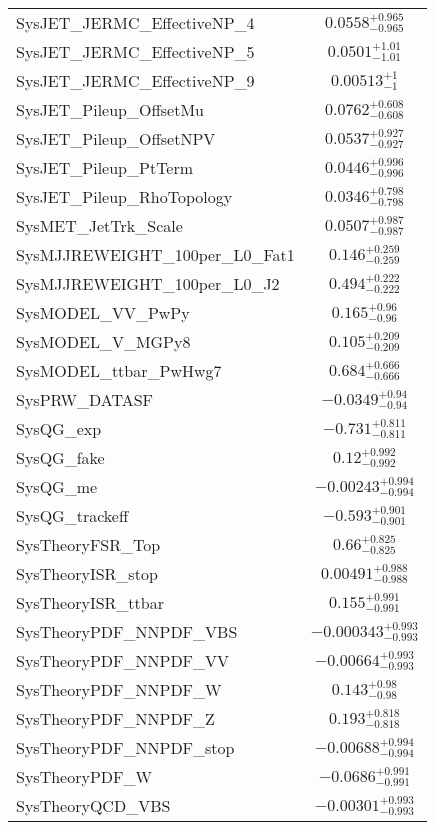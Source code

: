 \begin{tabular}{|l|c|}
SysJET\_JERMC\_EffectiveNP\_4 & $0.0558^{+0.965}_{-0.965}$ \\
SysJET\_JERMC\_EffectiveNP\_5 & $0.0501^{+1.01}_{-1.01}$ \\
SysJET\_JERMC\_EffectiveNP\_9 & $0.00513^{+1}_{-1}$ \\
SysJET\_Pileup\_OffsetMu & $0.0762^{+0.608}_{-0.608}$ \\
SysJET\_Pileup\_OffsetNPV & $0.0537^{+0.927}_{-0.927}$ \\
SysJET\_Pileup\_PtTerm & $0.0446^{+0.996}_{-0.996}$ \\
SysJET\_Pileup\_RhoTopology & $0.0346^{+0.798}_{-0.798}$ \\
SysMET\_JetTrk\_Scale & $0.0507^{+0.987}_{-0.987}$ \\
SysMJJREWEIGHT\_100per\_L0\_Fat1 & $0.146^{+0.259}_{-0.259}$ \\
SysMJJREWEIGHT\_100per\_L0\_J2 & $0.494^{+0.222}_{-0.222}$ \\
SysMODEL\_VV\_PwPy & $0.165^{+0.96}_{-0.96}$ \\
SysMODEL\_V\_MGPy8 & $0.105^{+0.209}_{-0.209}$ \\
SysMODEL\_ttbar\_PwHwg7 & $0.684^{+0.666}_{-0.666}$ \\
SysPRW\_DATASF & $-0.0349^{+0.94}_{-0.94}$ \\
SysQG\_exp & $-0.731^{+0.811}_{-0.811}$ \\
SysQG\_fake & $0.12^{+0.992}_{-0.992}$ \\
SysQG\_me & $-0.00243^{+0.994}_{-0.994}$ \\
SysQG\_trackeff & $-0.593^{+0.901}_{-0.901}$ \\
SysTheoryFSR\_Top & $0.66^{+0.825}_{-0.825}$ \\
SysTheoryISR\_stop & $0.00491^{+0.988}_{-0.988}$ \\
SysTheoryISR\_ttbar & $0.155^{+0.991}_{-0.991}$ \\
SysTheoryPDF\_NNPDF\_VBS & $-0.000343^{+0.993}_{-0.993}$ \\
SysTheoryPDF\_NNPDF\_VV & $-0.00664^{+0.993}_{-0.993}$ \\
SysTheoryPDF\_NNPDF\_W & $0.143^{+0.98}_{-0.98}$ \\
SysTheoryPDF\_NNPDF\_Z & $0.193^{+0.818}_{-0.818}$ \\
SysTheoryPDF\_NNPDF\_stop & $-0.00688^{+0.994}_{-0.994}$ \\
SysTheoryPDF\_W & $-0.0686^{+0.991}_{-0.991}$ \\
SysTheoryQCD\_VBS & $-0.00301^{+0.993}_{-0.993}$ \\

\end{tabular}
